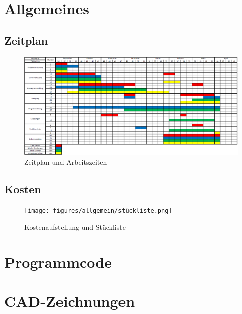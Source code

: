 \appendix
\chapter{Allgemeines}

\newpage

\section{Zeitplan}

\begin{figure} [H]
	\begin{center}
		\includegraphics[angle=90, scale=0.6] {figures/allgemein/zeitplan.png}
		\caption{Zeitplan und Arbeitszeiten}
		\label{fig:Zeitplan}
	\end{center}
\end{figure}

\newpage

\section{Kosten}


\begin{figure} [H]
	\begin{center}
		\texttt{[image: figures/allgemein/stückliste.png]}
		\caption{Kostenaufstellung und Stückliste}
		\label{fig:Stückliste}
	\end{center}
\end{figure}

\newpage

\chapter{Programmcode}

\chapter{CAD-Zeichnungen}

